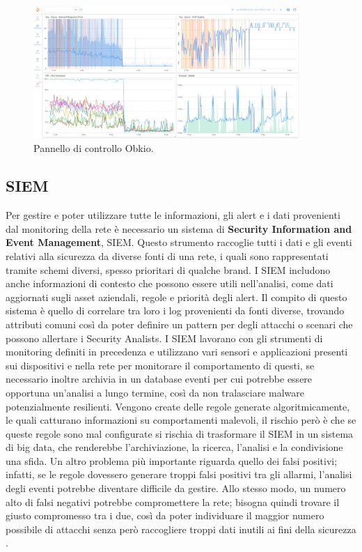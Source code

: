         \begin{figure}[H]
            \centering
            \includegraphics[width=0.9\textwidth]{Immagini/obkio_dashboard.jpg}
            \caption{Pannello di controllo Obkio.}
            \label{fig:obkio_dashboard}
        \end{figure}


    \subsection{SIEM}
        Per gestire e poter utilizzare tutte le informazioni, gli alert e i dati provenienti dal monitoring della rete è necessario un sistema di \textbf{Security Information and Event Management}, SIEM. Questo strumento raccoglie tutti i dati e gli eventi relativi alla sicurezza da diverse fonti di una rete, i quali sono rappresentati tramite schemi diversi, spesso prioritari di qualche brand. I SIEM includono anche informazioni di contesto che possono essere utili nell'analisi, come dati aggiornati sugli asset aziendali, regole e priorità degli alert. Il compito di questo sistema è quello di correlare tra loro i log provenienti da fonti diverse, trovando attributi comuni così da poter definire un pattern per degli attacchi o scenari che possono allertare i Security Analists. I SIEM lavorano con gli strumenti di monitoring definiti in precedenza e utilizzano vari sensori e applicazioni presenti sui dispositivi e nella rete per monitorare il comportamento di questi, se necessario inoltre archivia in un database eventi per cui potrebbe essere opportuna un'analisi a lungo termine, così da non tralasciare malware potenzialmente resilienti. 
        Vengono create delle regole generate algoritmicamente, le quali catturano informazioni su comportamenti malevoli, il rischio però è che se queste regole sono mal configurate si rischia di trasformare il SIEM in un sistema di big data, che renderebbe l'archiviazione, la ricerca, l'analisi e la condivisione una sfida. Un altro problema più importante riguarda quello dei falsi positivi; infatti, se le regole dovessero generare troppi falsi positivi tra gli allarmi, l'analisi degli eventi potrebbe diventare difficile da gestire. Allo stesso modo, un numero alto di falsi negativi potrebbe compromettere la rete; bisogna quindi trovare il giusto compromesso tra i due, così da poter individuare il maggior numero possibile di attacchi senza però raccogliere troppi dati inutili ai fini della sicurezza \cite{siem_and_soc_paper}.


